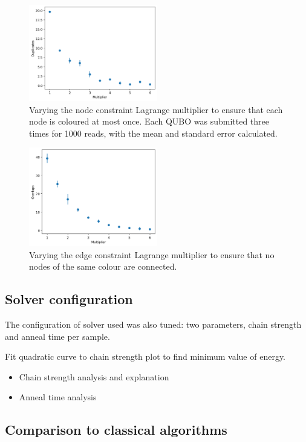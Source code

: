 \documentclass[12pt]{article}
\begin{document}
\begin{figure}
    \includegraphics[width=0.5\textwidth]{node-constraint.png}
    \caption{Varying the node constraint Lagrange multiplier to ensure that each node is coloured at most once. Each QUBO was submitted three times for 1000 reads, with the mean and standard error calculated.}
\end{figure}

\begin{figure}
    \includegraphics[width=0.5\textwidth]{edge-constraint.png}
    \caption{Varying the edge constraint Lagrange multiplier to ensure that no nodes of the same colour are connected.}
\end{figure}

\subsection{Solver configuration}

The configuration of solver used was also tuned: two parameters, chain strength and anneal time per sample.

Fit quadratic curve to chain strength plot to find minimum value of energy.

\begin{itemize}
    \item Chain strength analysis and explanation
    \item Anneal time analysis
\end{itemize}

\subsection{Comparison to classical algorithms}
\end{document}

